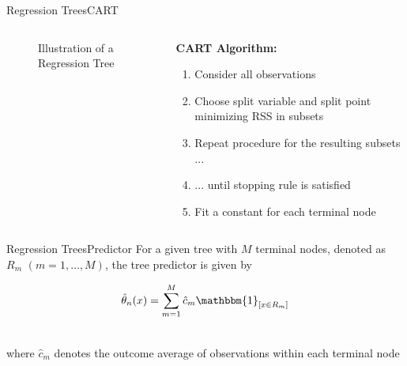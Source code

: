 \documentclass{beamer}
\begin{document}
\begin{frame}{Regression Trees}{CART}

\begin{columns}[T]
    \begin{column}{5cm}
    \begin{figure}
\caption{Illustration of a Regression Tree}
\end{figure}
   	
    \end{column}


    \begin{column}{5cm}
		\textbf{CART Algorithm:}
        \begin{enumerate}
        	\item <1-> Consider all observations
			\item <2-> Choose split variable and split point minimizing RSS in 					  subsets
			\item <3-> Repeat procedure for the resulting subsets ...
			\item <4-> ... until stopping rule is satisfied
            \item <5-> Fit a constant for each terminal node
		\end{enumerate}		
	\end{column}
	

\end{columns}

\end{frame}



\begin{frame}{Regression Trees}{Predictor}
For a given tree with $M$ terminal nodes, denoted as $R_m $ $(m= 1, \dots, M)$, the tree predictor is given by

$$\hat{\theta}_{n}(x)=\sum\limits_{m=1}^{M}\hat{c}_m\mathbbm{1}_{[x\in R_m]}$$

\ \\
where $\hat{c}_m$ denotes the outcome average of observations within each terminal node

\ \\

\end{frame}
\end{document}
